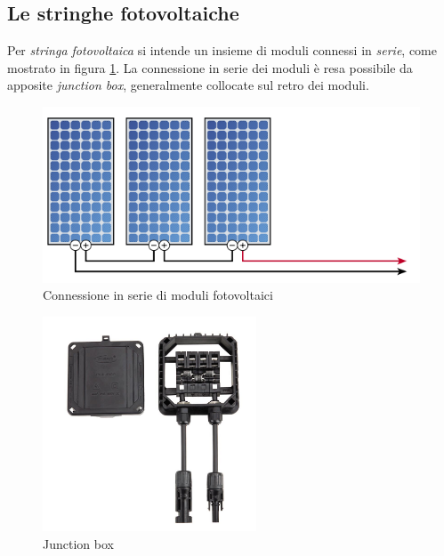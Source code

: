 %
\subsection{Le stringhe fotovoltaiche}
Per \emph{stringa fotovoltaica} si intende un insieme di moduli connessi in \emph{serie}, 
come mostrato in figura \ref{stringa}.
%
La connessione in serie dei moduli \`e resa possibile da apposite \emph{junction box}, 
generalmente collocate sul retro dei moduli.
%

%
\begin{figure}[!h]
\centering
\includegraphics[width=350pt]{img/pv-string.png}
\caption{Connessione in serie di moduli fotovoltaici}
\label{stringa}
\end{figure}
%
%
\begin{figure}[!h]
\centering
\includegraphics[width=180pt]{img/pv-junction-box.jpg}
\caption{Junction box}
\end{figure}
%

